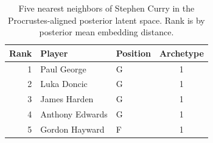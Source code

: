 \begin{table}[htbp]
  \centering\small
  \begin{tabular}{rllc}
    \toprule
    Rank & Player & Position & Archetype \\
    \midrule
    1 & Paul George & G & 1 \\
    2 & Luka Doncic & G & 1 \\
    3 & James Harden & G & 1 \\
    4 & Anthony Edwards & G & 1 \\
    5 & Gordon Hayward & F & 1 \\
    \bottomrule
  \end{tabular}
  \caption{Five nearest neighbors of Stephen Curry in the Procrustes-aligned posterior latent space. Rank is by posterior mean embedding distance.}
  \label{tab:Stephen_Curry_neighbors}
\end{table}

